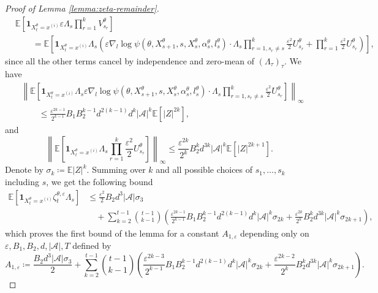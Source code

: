 \documentclass[10pt,a4paper]{amsart}
\def\cA{\mathcal{A}}
\def\eps{\varepsilon}
\begin{document}
\begin{proof}[Proof of Lemma \ref{lemma:zeta-remainder}]
\[\begin{aligned}
    &\mathbb E \left[ \mathbf 1_{X_t^\theta = x^{(i)}} \eps \Lambda_s\prod_{r = 1}^k V^\theta_{s_r}\right] \\
    & \qquad =\mathbb E \left[ \mathbf 1_{X_t^\theta = x^{(i)}} \Lambda_s \left( \eps \nabla_l \log \psi(\theta, X^\theta_{s + 1}, s,X_{s}^\theta, \alpha_{s}^\theta, l_{s}^\theta) \cdot \Lambda_{s} \prod_{r = 1, s_r \neq s}^{k} \frac{\eps^2}{2} U_{s_r}^\theta
    +\prod_{r=1}^{k} \frac{\eps^2}{2} U^\theta_{s_r} \right) \right],
    \end{aligned}
    \]
    since all the other terms cancel by independence and zero-mean of $(\Lambda_\tau)_\tau$.
    We have 
    \[
    \begin{aligned}
    &\left\|\mathbb E \left[ 
        \mathbf 1_{X_t^\theta = x^{(i)}} \Lambda_s \eps \nabla_l \log \psi(\theta, X^\theta_{s + 1}, s,X_{s}^\theta, \alpha_{s}^\theta, l_{s}^\theta) \cdot \Lambda_{s} 
        \prod_{r=1, s_r \neq s}^{k} \frac{\eps^2}{2} U^\theta_{s_r} \right] \right\|_\infty \\
        & \qquad \leq \frac{\eps^{2k - 1}}{2^{k-1}}B_1 B_2^{k-1} d^{2(k-1)} d^{k} | \cA |^k \mathbb E [|Z|^{2k}],
    \end{aligned}
    \] 
    and 
    \[
    \left\|\mathbb E \left[ \mathbf 1_{X_t^\theta = x^{(i)}} \Lambda_s \prod_{r=1}^{k} \frac{\eps^2}{2} U^\theta_{s_r} \right] \right\|_\infty 
        \leq \frac{\eps^{2k}}{2^{k}} B_2^{k} d^{3k} | \cA |^k \mathbb E [|Z|^{2k+1}].
    \]
    Denote by $\sigma_{k} \coloneq \mathbb E |Z|^k$. Summing over $k$ and all possible choices of $s_1, \ldots, s_k$ including $s$, we get the following bound
    \[
    \label{eq:bound-A1}
    \begin{aligned}
    \mathbb E \left[ \mathbf 1_{X_t^\theta = x^{(i)}} \zeta_t^{\theta, \eps} \Lambda_s \right] &\leq \frac{\eps^2}{2} B_2 d^3 | \cA | \sigma_3 \\
    & \quad + \sum_{k=2}^{t-1} \binom{t-1}{k-1} \left( \frac{\eps^{2k - 1}}{2^{k-1}}B_1 B_2^{k-1} d^{2(k-1)} d^{k} | \cA |^k \sigma_{2k} + \frac{\eps^{2k}}{2^{k}} B_2^{k} d^{3k} | \cA |^k \sigma_{2k + 1} \right),
    \end{aligned}
    \]
    which proves the first bound of the lemma for a constant $A_{1,\eps}$ depending only on $\eps, B_1,B_2, d, | \cA |, T$ defined by
    \begin{equation}
        \label{eq:def-A1}
         A_{1,\eps} \coloneq \frac{B_2 d^3 | \cA | \sigma_3}{2} + \sum_{k=2}^{t-1} \binom{t-1}{k-1} \left( \frac{\eps^{2k - 3}}{2^{k-1}}B_1 B_2^{k-1} d^{2(k-1)} d^{k} | \cA |^k \sigma_{2k} + \frac{\eps^{2k-2}}{2^{k}} B_2^{k} d^{3k} | \cA |^k \sigma_{2k + 1} \right).

\end{equation}
\end{proof}
\end{document}
